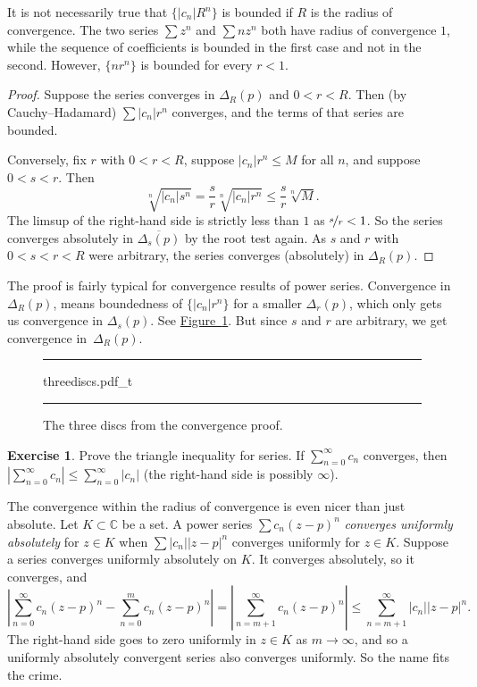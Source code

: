 \documentclass[12pt,openany]{book}
\newcommand{\sabs}[1]{\lvert {#1} \rvert}
\newcommand{\abs}[1]{\left\lvert {#1} \right\rvert}
\newcommand{\C}{{\mathbb{C}}}
\newcommand{\myindex}[1]{#1\index{#1}}
\theoremstyle{plain}
\theoremstyle{remark}
\theoremstyle{definition}
\newenvironment{exbox}{%
    \def\FrameCommand{\vrule width 1pt \relax\hspace{10pt}}%
    \MakeFramed{\advance\hsize-\width\FrameRestore}%
}{%
    \endMakeFramed
}
\newenvironment{myfig}{%
\begin{figure}[h!t]
\noindent\rule{\textwidth}{0.5pt}\vspace{12pt}\par\centering}%
{\par\noindent\rule{\textwidth}{0.5pt}
\end{figure}}
\theoremstyle{exercise}
\newtheorem{exercise}{Exercise}[section]
\theoremstyle{example}
\newcommand{\figureref}[1]{\hyperref[#1]{Figure~\ref*{#1}}}
\begin{document}
It is not necessarily true that $\bigl\{ \sabs{c_n} R^n \bigr\}$
is bounded if $R$ is the radius of convergence.
The two series $\sum z^n$ and $\sum n z^n$ both have
radius of convergence $1$, while the sequence of coefficients
is bounded in the first case and
not in the second.  However, $\{ n r^n \}$ is bounded for every $r < 1$.

\begin{proof}
Suppose the series converges in $\Delta_{R}(p)$ and
$0 < r < R$.  Then (by Cauchy--Hadamard) $\sum \sabs{c_n}r^n$ converges,
and the terms of that series are bounded.

Conversely, fix $r$ with $0 < r < R$, suppose 
$\sabs{c_n} r^n \leq M$ for all $n$, and suppose $0 < s < r$.
Then
\begin{equation*}
\sqrt[n]{\sabs{c_n} s^n}=
\frac{s}{r}\sqrt[n]{\sabs{c_n} r^n} \leq \frac{s}{r} \sqrt[n]{M} .
\end{equation*}
The limsup of the right-hand side is strictly less than $1$
as $\nicefrac{s}{r} < 1$.
So the series converges absolutely in
$\overline{\Delta_s(p)}$ by the root test again.
As $s$ and $r$ with $0 < s < r < R$ were arbitrary,
the series converges (absolutely) in $\Delta_R(p)$.
\end{proof}

The proof is fairly typical for convergence results of power series.
Convergence in $\Delta_R(p)$, means boundedness of
$\{ \sabs{c_n} r^n \}$ for a smaller $\Delta_r(p)$, which only gets us convergence
in $\Delta_s(p)$.  See \figureref{fig:threediscs}.  But since $s$ and $r$
are arbitrary, we get convergence in~$\Delta_R(p)$.
\begin{myfig}
{threediscs.pdf_t}
\caption{The three discs from the convergence proof.\label{fig:threediscs}}
\end{myfig}

\begin{exbox}
\begin{exercise}
Prove the triangle inequality for series.  If $\sum_{n=0}^\infty c_n$
converges, then $\abs{\sum_{n=0}^\infty c_n} \leq \sum_{n=0}^\infty
\sabs{c_n}$ (the right-hand side is possibly $\infty$).
\end{exercise}
\end{exbox}

The convergence within the radius of convergence is even nicer than just absolute.
Let $K \subset \C$ be a set.
A power series $\sum c_n {(z-p)}^n$
\emph{\myindex{converges uniformly absolutely}}
for $z \in K$ when $\sum \sabs{c_n} \sabs{z-p}^n$
converges uniformly for $z \in K$.
Suppose a series converges uniformly absolutely on $K$.  It converges absolutely,
so it converges, and 
\begin{equation*}
\abs{
\sum_{n=0}^\infty c_n {(z-p)}^n
-
\sum_{n=0}^{m} c_n {(z-p)}^n
}
=
\abs{\sum_{n=m+1}^\infty c_n {(z-p)}^n} \leq
\sum_{n=m+1}^\infty \sabs{c_n} \sabs{z-p}^n .
\end{equation*}
The right-hand side goes to zero uniformly in $z \in K$ as $m \to \infty$,
and so
a uniformly absolutely convergent series also converges
uniformly.  So the name fits the crime.
\end{document}
